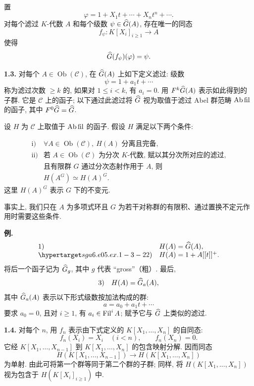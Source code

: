置
\[
  \varphi=1+X_1t+\cdots+X_nt^n+\cdots .
\]
对每个滤过 \(K\)-代数 \(A\) 和每个级数 \(\psi\in\widehat G(A)\), 存在唯一的同态
\[
  f_\psi:K[X_i]_{i\geq 1}\longrightarrow A
\]
使得
\[
  \widehat G(f_\psi)(\varphi)=\psi .
\]

\textbf{1.3.} 对每个 \(A\in\operatorname{Ob}(\mathcal C)\), 在 \(\widehat G(A)\) 上如下定义滤过: 级数
\[
  \psi=1+a_1t+\cdots
\]
称为滤过次数 \(\geq k\) 的, 如果对 \(1\leq i<k\), 有 \(a_i=0\). 用 \(F^k\widehat G(A)\) 表示如此得到的子群. 它是 \(\mathcal C\) 上的函子; 以下通过此滤过将 \(\widehat G\) 视为取值于滤过 Abel 群范畴 \(\mathrm{Ab\,fil}\) 的函子, 其中 \(F^0\widehat G=\widehat G\).

设 \(H\) 为 \(\mathcal C\) 上取值于 \(\mathrm{Ab\,fil}\) 的函子. 假设 \(H\) 满足以下两个条件:

\[
\begin{array}{ll}
\text{i)} & \forall A\in\operatorname{Ob}(\mathcal C),\ H(A)\text{ 分离且完备},\\[0.3em]
\text{ii)} & \text{若 }A\in\operatorname{Ob}(\mathcal C)\text{ 为分次 }K\text{-代数, 赋以其分次所对应的滤过,}\\
&\text{且有限群 }G\text{ 通过分次态射作用于 }A\text{, 则}\\
& H(A^G)\simeq H(A)^G .
\end{array}
\]
这里 \(H(A)^G\) 表示 \(G\) 下的不变元.

事实上, 我们只在 \(A\) 为多项式环且 \(G\) 为若干对称群的有限积、通过置换不定元作用时需要这些条件.

\textbf{例.}
\[
\begin{array}{ll}
1)& H(A)=\Ghat(A),\\
\sgaStableTarget{sga6.e05.ex.1-3-2}2)& H(A)=1+A[[t]]^+.
\end{array}
\]
将后一个函子记为 \(\widehat G_g\), 其中 \(g\) 代表 ``gross''（粗）. 最后,
\[
3)\quad H(A)=\widehat G_a(A),
\]
其中 \(\widehat G_a(A)\) 表示以下形式级数按加法构成的群:
\[
  a=a_0+a_1t+\cdots
\]
要求 \(a_0=0\), 且对 \(i\geq 1\), 有 \(a_i\in\operatorname{Fil}^i A\); 赋予它与 \(\widehat G\) 上类似的滤过.

\textbf{1.4.} 对每个 \(n\), 用 \(f_n\) 表示由下式定义的 \(K[X_1,\ldots,X_n]\) 的自同态:
\[
  f_n(X_i)=X_i\quad (i<n),\qquad f_n(X_n)=0.
\]
它经 \(K[X_1,\ldots,X_{n-1}]\) 到 \(K[X_1,\ldots,X_n]\) 的包含映射分解. 因而同态
\[
  H(K[X_1,\ldots,X_{n-1}])\longrightarrow H(K[X_1,\ldots,X_n])
\]
为单射. 由此可将第一个群等同于第二个群的子群; 同样, 将 \(H(K[X_1,\ldots,X_n])\) 视为包含于 \(H(K[X_i]_{i\geq 1})\) 中.

